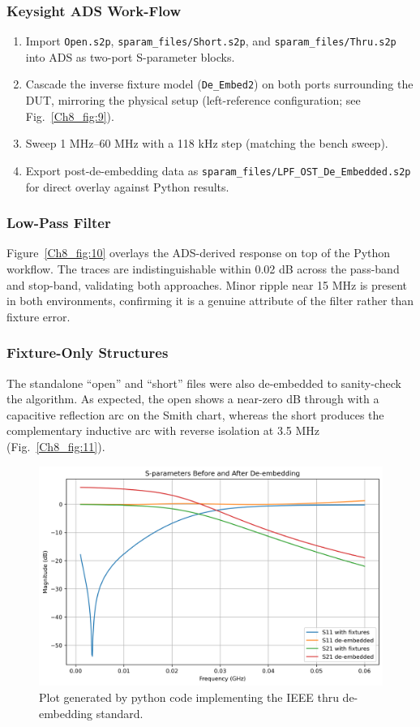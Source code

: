 \subsubsection{\textbf{Keysight ADS Work-Flow}}
\begin{enumerate}
    \item Import \texttt{Open.s2p}, 
    \texttt{sparam\_files/Short.s2p}, and \texttt{sparam\_files/Thru.s2p} 
    into ADS as two-port S-parameter blocks.
    \item Cascade the inverse fixture model (\texttt{De\_Embed2}) on both ports surrounding the DUT, mirroring the physical setup (left-reference configuration; see Fig.~\ref{Ch8_fig:9}).
    \item Sweep 1 MHz–60 MHz with a 118 kHz step (matching the bench sweep).
    \item Export post-de-embedding data as \texttt{sparam\_files/LPF\_OST\_De\_Embedded.s2p} for direct overlay against Python results.
\end{enumerate}

\subsubsection{Low-Pass Filter}
Figure~\ref{Ch8_fig:10} overlays the ADS-derived response on top of the Python workflow. The traces are indistinguishable within 0.02 dB across the pass-band and stop-band, validating both approaches. Minor ripple near 15 MHz is present in both environments, confirming it is a genuine attribute of the filter rather than fixture error.

\subsubsection{Fixture-Only Structures}
The standalone “open” and “short” files were also de-embedded to sanity-check the algorithm. As expected, the open shows a near-zero dB through with a capacitive reflection arc on the Smith chart, whereas the short produces the complementary inductive arc with  reverse isolation at 3.5 MHz (Fig.~\ref{Ch8_fig:11}).

\begin{figure}[H]
\centering
\includegraphics[width=.85\textwidth]{Chapter_8/images/Lab_08_ieee_thru_sparameters_plot.png}
\caption{Plot generated by python code implementing the IEEE thru de-embedding standard. \cite{ieee370_2020}}
\label{Ch8_fig:7}
\end{figure}

